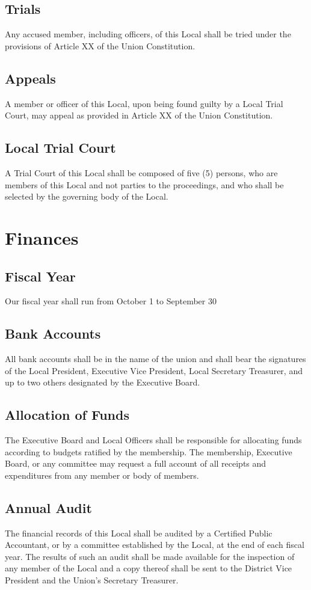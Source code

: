 \documentclass[11pt]{article}
\begin{document}
\subsection{Trials}
Any accused member, including officers, of this Local shall be tried under the provisions of Article XX of the Union  Constitution.

\subsection{Appeals}
A member or officer of this Local, upon being found guilty by a Local Trial Court, may appeal as provided in  Article XX of the Union Constitution.

\subsection{Local Trial Court}
A Trial Court of this Local shall be composed of five (5) persons, who are members of this Local and not parties to the proceedings, and who shall be selected by the governing body of the Local.

\section{Finances}
\subsection{Fiscal Year}
Our fiscal year shall run from October 1 to September 30

\subsection{Bank Accounts}
All bank accounts shall be in the name of the union and shall bear the signatures of the Local President, Executive Vice President, Local Secretary Treasurer, and up to two others designated by the Executive Board.

\subsection{Allocation of Funds}
The Executive Board and Local Officers shall be responsible for allocating funds according to budgets ratified by the membership. The membership, Executive Board, or any committee may request a full account of all receipts and expenditures from any member or body of members.

\subsection{Annual Audit}
The financial records of this Local shall be audited by a Certified Public Accountant, or by a committee established by the Local, at the end of each fiscal year. The results of such an audit shall be made available for the inspection of any member of the Local and a copy thereof shall be sent to the District Vice President and the Union’s Secretary Treasurer.
\end{document}
